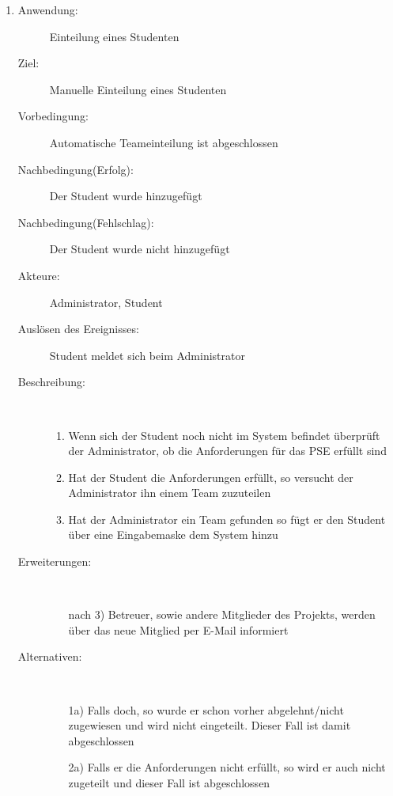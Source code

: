 \documentclass[parskip=full]{scrartcl}
\newcommand{\swtLabel}[1]{\textbf{\textbackslash #1\arabic*0\textbackslash}}
\begin{document}
\begin{enumerate} [label=\swtLabel{A}]
  
  \item
  \begin{description}
  \item[Anwendung:] Einteilung eines Studenten
  \item[Ziel:] Manuelle Einteilung eines Studenten
  	\item[Vorbedingung:] Automatische Teameinteilung ist abgeschlossen
  	\item[Nachbedingung(Erfolg):] Der Student wurde hinzugefügt
  	\item[Nachbedingung(Fehlschlag):] Der Student wurde nicht hinzugefügt
  	\item[Akteure:] Administrator, Student
  	\item[Auslösen des Ereignisses:] Student meldet sich beim Administrator
  	\item[Beschreibung:]~
  	 \begin{enumerate} 
  	   \item Wenn sich der Student noch nicht im System befindet überprüft der
  	   Administrator, ob die Anforderungen für das PSE erfüllt sind
  	   \item Hat der Student die Anforderungen erfüllt, so versucht der
  	   Administrator ihn einem Team zuzuteilen
  	   \item Hat der Administrator ein Team gefunden so fügt er den Student über
  	   eine Eingabemaske dem System hinzu
  	 \end{enumerate}
  	\item[Erweiterungen:]~
  	 \begin{enumerate}
  	   \item [nach 3)] Betreuer, sowie andere Mitglieder des Projekts, werden
  	   über das neue Mitglied per E-Mail informiert 
  	 \end{enumerate}  
  	\item[Alternativen:] ~
  	 \begin{enumerate}
  	  \item[1a)] Falls doch, so wurde er schon vorher abgelehnt/nicht zugewiesen
  	  und wird nicht eingeteilt. Dieser Fall ist damit abgeschlossen
  	  \item [2a)] Falls er die Anforderungen nicht erfüllt, so wird er auch nicht
  	  zugeteilt und dieser Fall ist abgeschlossen
  	 \end{enumerate}  
  \end{description}
   

\end{enumerate}
\end{document}
